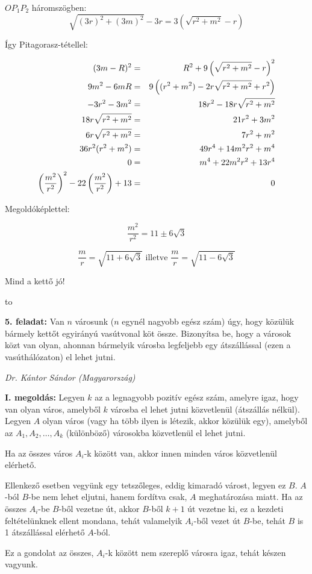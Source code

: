 \documentclass[a4paper,10pt]{article}
\newcommand{\ki}[2]{\hfill {\it #1 (#2)}\medskip}
\newcommand{\vonal}{\hbox to \hsize{\hskip2truecm\hrulefill\hskip2truecm}}
\begin{document}
$OP_1P_2$ háromszögben:
$$\sqrt{(3r)^2+(3m)^2}-3r=
3\left(\sqrt{r^2+m^2}-r\right)$$

Így Pitagorasz-tétellel:

\begin{eqnarray*}
(3m-R)^2&=& R^2+9\left(\sqrt{r^2+m^2}-r\right)^2\cr
9m^2-6mR &=& 9\left((r^2+m^2)-2r\sqrt{r^2+m^2}+r^2\right) \cr
-3r^2-3m^2  &=& 18r^2-18r\sqrt{r^2+m^2}\cr
18r\sqrt{r^2+m^2} &=& 21r^2+3m^2\cr
6r\sqrt{r^2+m^2}  &=& 7r^2+m^2\cr
36r^2(r^2+m^2)    &=& 49r^4+14m^2r^2+m^4\cr
0 &=& m^4+22m^2r^2+13r^4\cr
\left(\frac{m^2}{r^2}\right)^2-22\left(\frac{m^2}{r^2}\right)+13       &=& 0\cr
\end{eqnarray*}

Megoldóképlettel:

$$\frac{m^2}{r^2}=11\pm 6\sqrt{3}$$

$$\frac{m}{r}=\sqrt{11+6\sqrt{3}}\text{~illetve~}
\frac{m}{r}=\sqrt{11-6\sqrt{3}}$$

Mind a kettő jó!
\medskip

\vonal


{\bf 5. feladat: } Van $n$ városunk ($n$ egynél nagyobb egész szám) úgy, hogy közülük bármely kettőt
egyirányú vasútvonal köt össze. Bizonyítsa be, hogy a városok közt van olyan, ahonnan
bármelyik városba legfeljebb egy átszállással (ezen a vasúthálózaton) el lehet jutni.


\ki{Dr. Kántor Sándor}{Magyarország}\medskip

{\bf I. megoldás: } Legyen $k$ az a legnagyobb pozitív egész szám, amelyre igaz, hogy van olyan város,
amelyből $k$ városba el lehet jutni közvetlenül (átszállás nélkül).
Legyen $A$ olyan város (vagy ha több ilyen is létezik, akkor közülük egy), amelyből az $A_1,
A_2, \ldots, A_k$ (különböző) városokba közvetlenül el lehet jutni.

Ha az összes város $A_i$-k között van, akkor innen minden város közvetlenül elérhető.

Ellenkező esetben vegyünk egy tetszőleges, eddig kimaradó várost, legyen ez $B$.
$A$-ból $B$-be nem lehet eljutni, hanem fordítva csak, $A$ meghatározása miatt.
Ha az összes $A_i$-be $B$-ből vezetne út, akkor $B$-ből $k+1$
út vezetne ki, ez a kezdeti
feltételünknek ellent mondana, tehát valamelyik 
$A_i$-ből vezet út $B$-be, tehát $B$ is 1
átszállással elérhető $A$-ból.

Ez a gondolat az összes, $A_i$-k között nem szereplő városra igaz, tehát készen vagyunk.



\medskip
\end{document}
